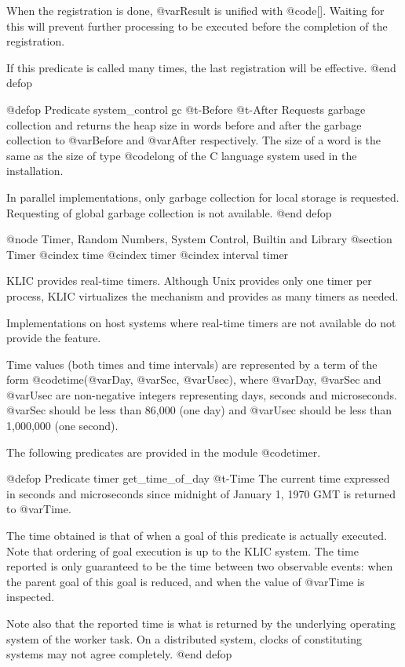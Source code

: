 {{{{When the registration is done, @var{Result} is unified with @code{[]}.
Waiting for this will prevent further processing to be executed before
the completion of the registration.

If this predicate is called many times, the last registration will
be effective.
@end defop

@defop {Predicate} {system_control} gc @t{-}Before @t{-}After
Requests garbage collection and returns the heap size in words before
and after the garbage collection to @var{Before} and @var{After}
respectively.  The size of a word is the same as the size of type
@code{long} of the C language system used in the installation.

In parallel implementations, only garbage collection for local storage
is requested.  Requesting of global garbage collection is not
available.
@end defop

@node Timer, Random Numbers, System Control, Builtin and Library
@section Timer
@cindex time
@cindex timer
@cindex interval timer

KLIC provides real-time timers.  Although Unix provides only one timer
per process, KLIC virtualizes the mechanism and provides as many timers
as needed.

Implementations on host systems where real-time timers are not available
do not provide the feature.

Time values (both times and time intervals) are represented by a term of
the form @code{time(@var{Day}, @var{Sec}, @var{Usec})}, where @var{Day},
@var{Sec} and @var{Usec} are non-negative integers representing days,
seconds and microseconds.  @var{Sec} should be less than 86,000 (one
day) and @var{Usec} should be less than 1,000,000 (one second).

The following predicates are provided in the module @code{timer}.

@defop {Predicate} {timer} get_time_of_day @t{-}Time
The current time expressed in seconds and microseconds since midnight of
January 1, 1970 GMT is returned to @var{Time}.

The time obtained is that of when a goal of this predicate is actually
executed.  Note that ordering of goal execution is up to the KLIC
system.  The time reported is only guaranteed to be the time between two
observable events: when the parent goal of this goal is reduced, and
when the value of @var{Time} is inspected.

Note also that the reported time is what is returned by the underlying
operating system of the worker task.  On a distributed system, clocks of
constituting systems may not agree completely.
@end defop

}}}}

